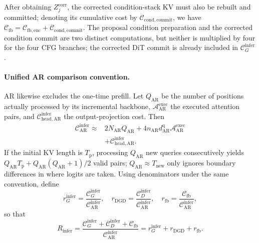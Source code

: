 After obtaining $Z_j^{\mathrm{corr}}$, the corrected condition-stack KV must also be rebuilt and committed; denoting its cumulative cost by $\mathcal C_{\mathrm{cond,commit}}$, we have $\mathcal C_{\mathrm{fb}}=\mathcal C_{\mathrm{fb,enc}}+\mathcal C_{\mathrm{cond,commit}}$. The proposal condition preparation and the corrected condition commit are two distinct computations, but neither is multiplied by four for the four CFG branches; the corrected DiT commit is already included in $\mathcal C_G^{\mathrm{infer}}$.

\paragraph{Unified AR comparison convention.}
AR likewise excludes the one-time prefill. Let $Q_{\mathrm{AR}}$ be the number of positions actually processed by its incremental backbone, $\mathcal A_{\mathrm{AR}}^{\mathrm{exec}}$ the executed attention pairs, and $\mathcal C_{\mathrm{head,AR}}^{\mathrm{infer}}$ the output-projection cost. Then
\begin{equation}
\begin{aligned}
    \mathcal C_{\mathrm{AR}}^{\mathrm{infer}}
    \approx{}&2N_{\mathrm{AR}}Q_{\mathrm{AR}}
      +4n_{\mathrm{AR}}d_{\mathrm{AR}}^{\mathrm q}
        \mathcal A_{\mathrm{AR}}^{\mathrm{exec}}\\
      &+\mathcal C_{\mathrm{head,AR}}^{\mathrm{infer}}.
\end{aligned}
\label{eq:app-cost-ar-inference}
\end{equation}
If the initial KV length is $T_{\mathrm p}$, processing $Q_{\mathrm{AR}}$ new queries consecutively yields $Q_{\mathrm{AR}}T_{\mathrm p}+Q_{\mathrm{AR}}(Q_{\mathrm{AR}}+1)/2$ valid pairs; $Q_{\mathrm{AR}}\approx T_{\mathrm{new}}$ only ignores boundary differences in where logits are taken. Using denominators under the same convention, define
\begin{equation}
    r_G^{\mathrm{infer}}=\frac{\mathcal C_G^{\mathrm{infer}}}
                                 {\mathcal C_{\mathrm{AR}}^{\mathrm{infer}}},
    \quad r_{\mathrm{DGD}}=\frac{\mathcal C_D^{\mathrm{infer}}}
                               {\mathcal C_{\mathrm{AR}}^{\mathrm{infer}}},
    \quad r_{\mathrm{fb}}=\frac{\mathcal C_{\mathrm{fb}}}
                              {\mathcal C_{\mathrm{AR}}^{\mathrm{infer}}},
    \label{eq:app-cost-infer-normalized-parts}
\end{equation}
so that
\begin{equation}
    R_{\mathrm{infer}}
    =\frac{\mathcal C_G^{\mathrm{infer}}+\mathcal C_D^{\mathrm{infer}}
           +\mathcal C_{\mathrm{fb}}}{\mathcal C_{\mathrm{AR}}^{\mathrm{infer}}}
    =r_G^{\mathrm{infer}}+r_{\mathrm{DGD}}+r_{\mathrm{fb}}.
    \label{eq:app-infer-flop-ratio-ar}
\end{equation}
